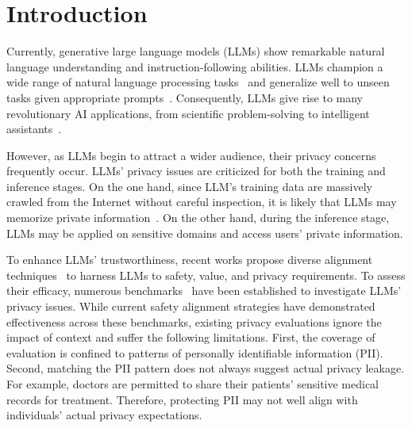 \section{Introduction}
\label{sec: intro}

Currently, generative large language models (LLMs) show remarkable natural language understanding and instruction-following abilities.
LLMs champion a wide range of natural language processing tasks~\cite{2020t5,2022flant5,Brown2020LanguageMA,OpenAI2023GPT4TR, ouyang2022training} and generalize well to unseen tasks given appropriate prompts~\cite{zhou2023leasttomost, Kojima2022LargeLM, Wei2022ChainOT,sanh2022multitask}.
Consequently, LLMs give rise to many revolutionary AI applications, from scientific problem-solving to intelligent assistants~\cite{schick2023toolformer,tong2024dartmath, wang2024voyager}.


However, as LLMs begin to attract a wider audience, their privacy concerns frequently occur.
LLMs' privacy issues are criticized for both the training and inference stages.
On the one hand, since LLM's training data are massively crawled from the Internet without careful inspection, it is likely that LLMs may memorize private information~\cite{carlini-2021-extracting, LI-2023-Jailbreak, Ishihara2023TrainingDE}.
On the other hand, during the inference stage, LLMs may be applied on sensitive domains and access users' private information.



To enhance LLMs' trustworthiness, recent works propose diverse alignment techniques~\cite{Christiano-2017-rlhf, rafailov2023direct, inan-2023-llama-guard} to harness LLMs to safety, value, and privacy requirements.
To assess their efficacy, numerous benchmarks~\cite{LI-2023-Jailbreak, Li-LLMPBE-2024,zeng2024privacyrestore} have been established to investigate LLMs' privacy issues.
While current safety alignment strategies have demonstrated effectiveness across these benchmarks, existing privacy evaluations ignore the impact of context and suffer the following limitations.
First, the coverage of evaluation is confined to patterns of personally identifiable information (PII).
Second, matching the PII pattern does not always suggest actual privacy leakage.
For example, doctors are permitted to share their patients' sensitive medical records for treatment.
Therefore,  protecting PII may not well align with individuals' actual privacy expectations.

